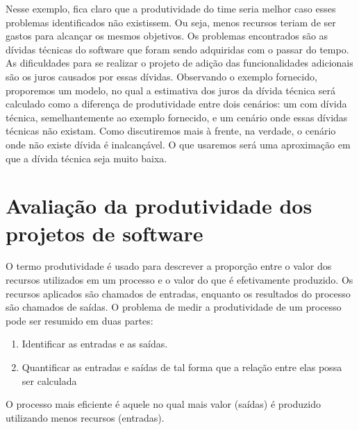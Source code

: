 Nesse exemplo, fica claro que a produtividade do time seria melhor caso esses problemas identificados não existissem. Ou seja, menos recursos teriam de ser gastos para alcançar os mesmos objetivos. Os problemas encontrados são as dívidas técnicas do software que foram sendo adquiridas com o passar do tempo. As dificuldades para se realizar o projeto de adição das funcionalidades adicionais são os juros causados por essas dívidas. Observando o exemplo fornecido, proporemos um modelo, no qual a estimativa dos juros da dívida técnica será calculado como a diferença de produtividade entre dois cenários: um com dívida técnica, semelhantemente ao exemplo fornecido, e um cenário onde essas dívidas técnicas não existam. Como discutiremos mais à frente, na verdade, o cenário onde não existe dívida é inalcançável. O que usaremos será uma aproximação em que a dívida técnica seja muito baixa. 


\section{Avaliação da produtividade dos projetos de software}
\label{modelo_de_estimacao_produtividade}

O termo produtividade é usado para descrever a proporção entre o valor dos recursos utilizados em um processo e o valor do que é efetivamente produzido. Os recursos aplicados são chamados de entradas, enquanto os resultados do processo são chamados de saídas. O problema de medir a produtividade de um processo pode ser resumido em duas partes:

\begin{enumerate}
\item Identificar as entradas e as saídas.
\item Quantificar  as entradas e saídas de tal forma que a relação entre elas possa ser calculada
\end{enumerate} 

O processo mais eficiente é aquele no qual mais valor (saídas) é produzido utilizando menos recursos (entradas).

